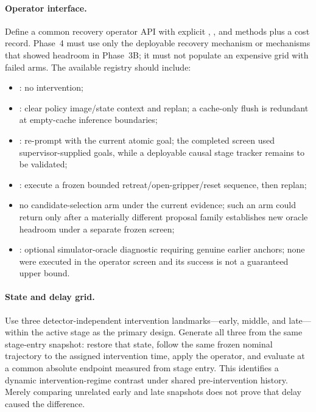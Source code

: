 \paragraph{Operator interface.}
Define a common recovery operator API with explicit , , and  methods plus a cost record. Phase~4 must use only the deployable recovery mechanism or mechanisms that showed headroom in Phase~3B; it must not populate an expensive grid with failed arms. The available registry should include:
\begin{itemize}
  \item {}: no intervention;
  \item {}: clear policy image/state context and replan; a cache-only flush is redundant at empty-cache inference boundaries;
  \item {}: re-prompt with the current atomic goal; the completed screen used supervisor-supplied goals, while a deployable causal stage tracker remains to be validated;
  \item {}: execute a frozen bounded retreat/open-gripper/reset sequence, then replan;
  \item no candidate-selection arm under the current evidence; such an arm could return only after a materially different proposal family establishes new oracle headroom under a separate frozen screen;
  \item {}: optional simulator-oracle diagnostic requiring genuine earlier anchors; none were executed in the operator screen and its success is not a guaranteed upper bound.
\end{itemize}

\paragraph{State and delay grid.}
Use three detector-independent intervention landmarks---early, middle, and late---within the active stage as the primary design. Generate all three from the same stage-entry snapshot: restore that state, follow the same frozen nominal trajectory to the assigned intervention time, apply the operator, and evaluate at a common absolute endpoint measured from stage entry. This identifies a dynamic intervention-regime contrast under shared pre-intervention history. Merely comparing unrelated early and late snapshots does not prove that delay caused the difference.

